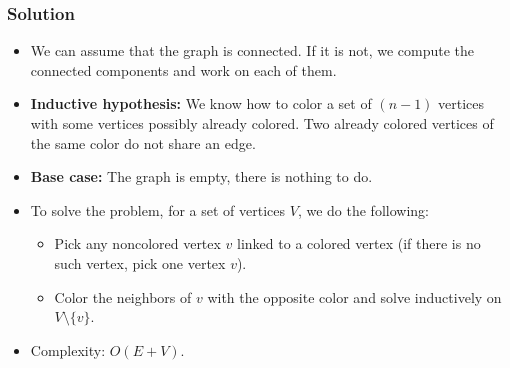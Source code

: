 \documentclass{beamer}
\begin{document}
\begin{frame}%
\frametitle{Solution}

\scriptsize

\begin{itemize}
\item We can assume that the graph is connected. If it is not, we compute the connected components
and work on each of them.

\vspace{0.2cm}

\item<2-> \textbf{Inductive hypothesis:} We know how to color a set of $(n-1)$ vertices with some vertices
possibly already colored. Two already colored vertices of the same color do not share an edge.

\vspace{0.2cm}

\item<3-> \textbf{Base case:} The graph is empty, there is nothing to do.

\vspace{0.2cm}

\item<4-> To solve the problem, for a set of vertices $V$, we do the following:
\begin{itemize}
\scriptsize
\item<4-> Pick any noncolored vertex $v$ linked to a colored vertex (if there is no such vertex, pick one vertex $v$).
\item<5-> Color the neighbors of $v$ with the opposite color and solve inductively on $V \setminus \{v\}$.
\end{itemize}

\vspace{0.2cm}

\item<6-> Complexity: $O(E + V)$.

\end{itemize}

\end{frame}

\end{document}
